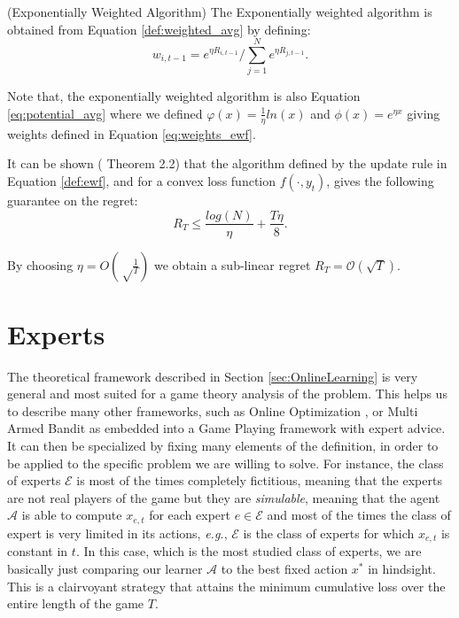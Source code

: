 \begin{definition}(Exponentially Weighted Algorithm)\label{def:ewf}
	The Exponentially weighted algorithm is obtained from Equation \eqref{def:weighted_avg} by defining:
	\begin{equation}\label{eq:weights_ewf}
	w_{i,t-1}=e^{\eta R_{i,t-1}}/\sum\limits_{j=1}^Ne^{\eta R_{j,t-1}}.
	\end{equation}
\end{definition}

Note that, the exponentially weighted algorithm is also Equation \eqref{eq:potential_avg} where we defined $\varphi(x)=\frac{1}{\eta}ln(x)$ and $\phi(x)=e^{\eta x}$ giving weights defined in Equation \eqref{eq:weights_ewf}.

It can be shown (\cite{cesa2006prediction} Theorem 2.2) that the algorithm defined by the update rule in Equation \eqref{def:ewf}, and for a convex loss function $f(\cdot,y_t)$, gives the following guarantee on the regret:
\begin{equation}\label{eq:regret_ewf}
R_T\le \frac{log(N)}{\eta}+\frac{T\eta}{8}.
\end{equation}

By choosing $\eta=O\left(\sqrt\frac{1}{T}\right)$ we obtain a sub-linear regret $R_T=\mathcal O(\sqrt T)$. %



\section{Experts}
The theoretical framework described in Section \ref{sec:OnlineLearning} is very general and most suited for a game theory analysis of the problem. This helps us to describe many other frameworks, such as Online Optimization \cite{hazan2016introduction}, or Multi Armed Bandit \cite{bubeck2012regret} as embedded into a Game Playing framework with expert advice. It can then be specialized by fixing many elements of the definition, in order to be applied to the specific problem we are willing to solve.
For instance, the class of experts $\mathcal E$ is most of the times completely fictitious, meaning that the experts are not real players of the game but they are \emph{simulable}, meaning that the agent $\mathcal A$ is able to compute $x_{e,t}$ for each expert $e\in\mathcal E$ and most of the times the class of expert is very limited in its actions, \emph{e.g.}, $\mathcal E$ is the class of experts for which $x_{e,t}$ is constant in $t$. In this case, which is the most studied class of experts, we are basically just comparing our learner $\mathcal A$ to the best fixed action $x^*$ in hindsight. This is a clairvoyant strategy that attains the minimum cumulative loss over the entire length of the game $T$.

